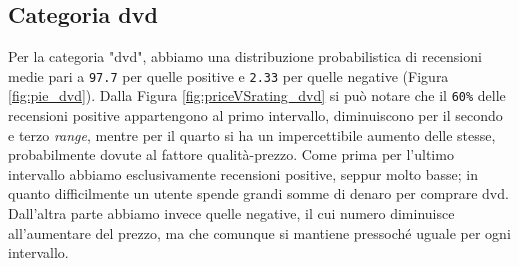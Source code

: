 			
			\subsection{Categoria dvd}
			Per la categoria "dvd", abbiamo una distribuzione probabilistica di recensioni medie pari a \verb|97.7| per quelle positive e \verb|2.33| per quelle negative (Figura \ref{fig:pie_dvd}).
			Dalla Figura \ref{fig:priceVSrating_dvd} si può notare che il \verb|60%| delle recensioni positive appartengono al primo intervallo, diminuiscono per il secondo e terzo \textit{range}, mentre per il quarto si ha un impercettibile aumento delle stesse, probabilmente dovute al fattore qualità-prezzo. Come prima per l'ultimo intervallo abbiamo esclusivamente recensioni positive, seppur molto basse; in quanto difficilmente un utente spende grandi somme di denaro per comprare dvd. Dall'altra parte abbiamo invece quelle negative, il cui numero diminuisce all'aumentare del prezzo, ma che comunque si mantiene pressoché uguale per ogni intervallo.
			

